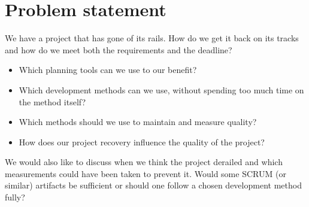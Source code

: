 \section{Problem statement}
We have a project that has gone of its rails. How do we get it back on its tracks and how do we meet both the requirements and the deadline?
\newline
\begin{itemize}
\item Which planning tools can we use to our benefit?
\item Which development methods can we use, without spending too much time on the method itself?
\item Which methods should we use to maintain and measure quality?
\item How does our project recovery influence the quality of the project?
\end{itemize}
We would also like to discuss when we think the project derailed and which measurements could have been taken to prevent it. Would some SCRUM (or similar) artifacts be sufficient or should one follow a chosen development method fully?
\newpage